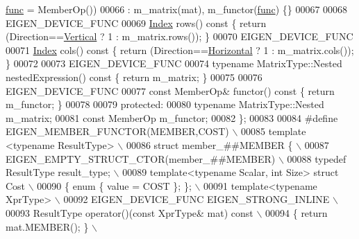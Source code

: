 \begin{DoxyCode}
      \hyperlink{structfunc}{func} = MemberOp())
00066       : m\_matrix(mat), m\_functor(\hyperlink{structfunc}{func}) \{\}
00067 
00068     EIGEN\_DEVICE\_FUNC
00069     \hyperlink{namespace_eigen_a62e77e0933482dafde8fe197d9a2cfde}{Index} rows()\textcolor{keyword}{ const }\{ \textcolor{keywordflow}{return} (Direction==\hyperlink{group__enums_ggad49a7b3738e273eb00932271b36127f7addca718e0564723df21d61b94b1198be}{Vertical}   ? 1 : m\_matrix.rows()); \}
00070     EIGEN\_DEVICE\_FUNC
00071     \hyperlink{namespace_eigen_a62e77e0933482dafde8fe197d9a2cfde}{Index} cols()\textcolor{keyword}{ const }\{ \textcolor{keywordflow}{return} (Direction==\hyperlink{group__enums_ggad49a7b3738e273eb00932271b36127f7aae8a16b3b9272683c1162915f6d892be}{Horizontal} ? 1 : m\_matrix.cols()); \}
00072 
00073     EIGEN\_DEVICE\_FUNC
00074     \textcolor{keyword}{typename} MatrixType::Nested nestedExpression()\textcolor{keyword}{ const }\{ \textcolor{keywordflow}{return} m\_matrix; \}
00075 
00076     EIGEN\_DEVICE\_FUNC
00077     \textcolor{keyword}{const} MemberOp& functor()\textcolor{keyword}{ const }\{ \textcolor{keywordflow}{return} m\_functor; \}
00078 
00079   \textcolor{keyword}{protected}:
00080     \textcolor{keyword}{typename} MatrixType::Nested m\_matrix;
00081     \textcolor{keyword}{const} MemberOp m\_functor;
00082 \};
00083 
00084 \textcolor{preprocessor}{#define EIGEN\_MEMBER\_FUNCTOR(MEMBER,COST)                               \(\backslash\)}
00085 \textcolor{preprocessor}{  template <typename ResultType>                                        \(\backslash\)}
00086 \textcolor{preprocessor}{  struct member\_##MEMBER \{                                              \(\backslash\)}
00087 \textcolor{preprocessor}{    EIGEN\_EMPTY\_STRUCT\_CTOR(member\_##MEMBER)                            \(\backslash\)}
00088 \textcolor{preprocessor}{    typedef ResultType result\_type;                                     \(\backslash\)}
00089 \textcolor{preprocessor}{    template<typename Scalar, int Size> struct Cost                     \(\backslash\)}
00090 \textcolor{preprocessor}{    \{ enum \{ value = COST \}; \};                                         \(\backslash\)}
00091 \textcolor{preprocessor}{    template<typename XprType>                                          \(\backslash\)}
00092 \textcolor{preprocessor}{    EIGEN\_DEVICE\_FUNC EIGEN\_STRONG\_INLINE                               \(\backslash\)}
00093 \textcolor{preprocessor}{    ResultType operator()(const XprType& mat) const                     \(\backslash\)}
00094 \textcolor{preprocessor}{    \{ return mat.MEMBER(); \} \(\backslash\)}

\end{DoxyCode}
